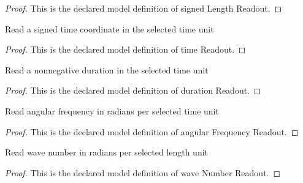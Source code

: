 \begin{proof}
  This is the declared model definition of signed Length Readout.
\end{proof}
\begin{definition}
  \label{def:physics:phyx-mini-0296:phyxminiproblems-problemphyxmini0296-timereadout}
  Read a signed time coordinate in the selected time unit
\end{definition}
\begin{proof}
  This is the declared model definition of time Readout.
\end{proof}
\begin{definition}
  \label{def:physics:phyx-mini-0296:phyxminiproblems-problemphyxmini0296-durationreadout}
  Read a nonnegative duration in the selected time unit
\end{definition}
\begin{proof}
  This is the declared model definition of duration Readout.
\end{proof}
\begin{definition}
  \label{def:physics:phyx-mini-0296:phyxminiproblems-problemphyxmini0296-angularfrequencyreadout}
  Read angular frequency in radians per selected time unit
\end{definition}
\begin{proof}
  This is the declared model definition of angular Frequency Readout.
\end{proof}
\begin{definition}
  \label{def:physics:phyx-mini-0296:phyxminiproblems-problemphyxmini0296-wavenumberreadout}
  Read wave number in radians per selected length unit
\end{definition}
\begin{proof}
  This is the declared model definition of wave Number Readout.
\end{proof}

